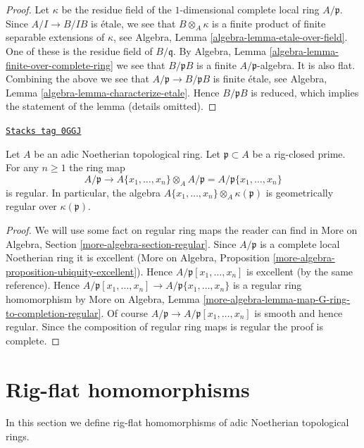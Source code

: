 \begin{proof}
Let $\kappa$ be the residue field of the $1$-dimensional complete
local ring $A/\mathfrak p$. Since $A/I \to B/IB$ is \'etale, we see that
$B \otimes_A \kappa$ is a finite product of finite separable
extensions of $\kappa$, see
Algebra, Lemma \ref{algebra-lemma-etale-over-field}.
One of these is the residue field of $B/\mathfrak q$.
By Algebra, Lemma \ref{algebra-lemma-finite-over-complete-ring} we see that
$B/\mathfrak p B$ is a finite $A/\mathfrak p$-algebra.
It is also flat. Combining the above
we see that $A/\mathfrak p  \to B /\mathfrak p B$
is finite \'etale, see
Algebra, Lemma \ref{algebra-lemma-characterize-etale}.
Hence $B/\mathfrak p B$ is reduced, which implies the statement of
the lemma (details omitted).
\end{proof}

\begin{lemma}
\label{restricted-lemma-fibre-regular}
\href{https://stacks.math.columbia.edu/tag/0GGJ}{\texttt{Stacks tag 0GGJ}}

Let $A$ be an adic Noetherian topological ring.
Let $\mathfrak p \subset A$ be a rig-closed prime.
For any $n \geq 1$ the ring map
$$
A/\mathfrak p
\longrightarrow
A\{x_1, \ldots, x_n\} \otimes_A A/\mathfrak p =
A/\mathfrak p\{x_1, \ldots, x_n\}
$$
is regular. In particular, the algebra
$A\{x_1, \ldots, x_n\} \otimes_A \kappa(\mathfrak p)$
is geometrically regular over $\kappa(\mathfrak p)$.
\end{lemma}

\begin{proof}
We will use some fact on regular ring maps the reader can find
in More on Algebra, Section \ref{more-algebra-section-regular}.
Since $A/\mathfrak p$ is a complete local Noetherian ring it
is excellent (More on Algebra, Proposition
\ref{more-algebra-proposition-ubiquity-excellent}).
Hence $A/\mathfrak p[x_1, \ldots, x_n]$ is excellent
(by the same reference). Hence
$A/\mathfrak p[x_1, \ldots, x_n] \to A/\mathfrak p\{x_1, \ldots, x_n\}$
is a regular ring homomorphism by
More on Algebra, Lemma
\ref{more-algebra-lemma-map-G-ring-to-completion-regular}.
Of course $A/\mathfrak p \to A/\mathfrak p[x_1, \ldots, x_n]$
is smooth and hence regular. Since the composition of regular
ring maps is regular the proof is complete.
\end{proof}

\section{Rig-flat homomorphisms}
\label{restricted-section-rig-flat-homomorphisms}
In this section we define rig-flat homomorphisms of adic Noetherian
topological rings.

